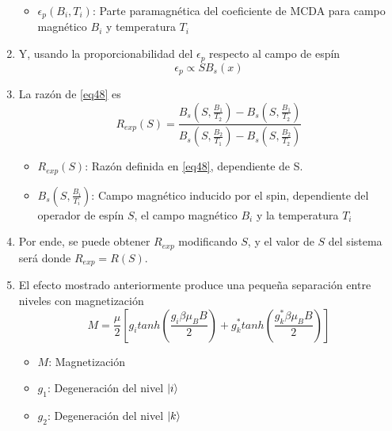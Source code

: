 \documentclass[aps,rmp,reprint,longbibliography]{revtex4-1}
\begin{document}
\begin{enumerate}
\begin{itemize}
    \item $\epsilon_p(B_i,T_i)$: Parte paramagnética del coeficiente de MCDA para campo magnético $B_i$ y temperatura $T_i$
\end{itemize}
\item Y, usando la proporcionabilidad del $\epsilon_p$ respecto al campo de espín
\begin{equation}\label{eq49}\epsilon_p\propto SB_s(x)\end{equation}
\item La razón de \ref{eq48} es
\begin{equation}\label{eq50}R_{exp}(S)=\frac{B_s(S,\frac{B_1}{T_2})-B_s(S,\frac{B_1}{T_2})}{B_s(S,\frac{B_2}{T_1})-B_s(S,\frac{B_2}{T_2})}\end{equation}
\begin{itemize}
    \item $R_{exp}(S)$: Razón definida en \ref{eq48}, dependiente de S.
    \item $B_s(S,\frac{B_i}{T_i})$: Campo magnético inducido por el spin, dependiente del operador de espín $S$, el campo magnético $B_i$ y la temperatura $T_i$
\end{itemize}
\item Por ende, se puede obtener $R_{exp}$ modificando $S$, y el valor de $S$ del sistema será donde $R_{exp}=R(S)$.
\item El efecto mostrado anteriormente produce una pequeña separación entre niveles con magnetización
\begin{equation}\label{eq51}M=\frac{\mu}{2}[g_itanh(\frac{g_i\beta\mu_B B
}{2})+g_k^*tanh(\frac{g_k^*\beta\mu_B B}{2})]\end{equation} 
\begin{itemize}
    \item $M$: Magnetización
    \item $g_1$: Degeneración del nivel $\ket{i}$
    \item $g_2$: Degeneración del nivel $\ket{k}$
\end{itemize}

\end{enumerate}
\end{document}

